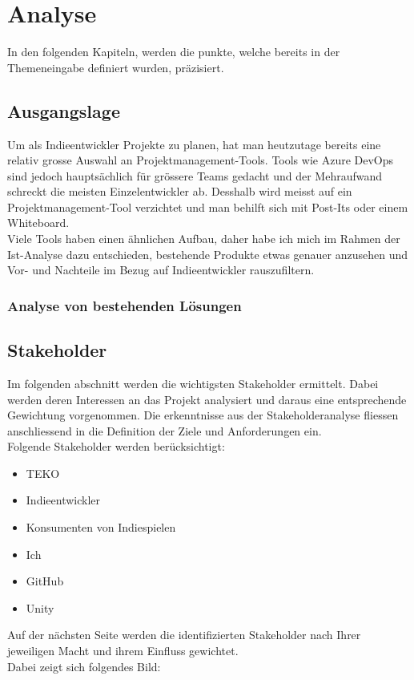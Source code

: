 \section{Analyse}
In den folgenden Kapiteln, werden die punkte, welche bereits in der Themeneingabe
definiert wurden, präzisiert.

\subsection{Ausgangslage}
Um als Indieentwickler Projekte zu planen, hat man heutzutage bereits eine relativ grosse Auswahl an
Projektmanagement-Tools.
Tools wie Azure DevOps sind jedoch hauptsächlich für grössere Teams gedacht und der Mehraufwand schreckt die meisten Einzelentwickler ab.
Desshalb wird meisst auf ein Projektmanagement-Tool verzichtet und man behilft sich mit Post-Its oder einem Whiteboard.\\
Viele Tools haben einen ähnlichen Aufbau, daher habe ich mich im Rahmen der Ist-Analyse dazu entschieden, bestehende Produkte etwas genauer anzusehen und Vor- und Nachteile 
im Bezug auf Indieentwickler rauszufiltern.

\subsubsection{Analyse von bestehenden Lösungen}


\newpage

\newpage

\subsection{Stakeholder}

Im folgenden abschnitt werden die wichtigsten Stakeholder ermittelt.
Dabei werden deren Interessen an das Projekt analysiert und daraus eine entsprechende Gewichtung vorgenommen.
Die erkenntnisse aus der Stakeholderanalyse fliessen anschliessend in die
Definition der Ziele und Anforderungen ein.\\
Folgende Stakeholder werden berücksichtigt:\\

\begin{itemize}
    \item TEKO
    \item Indieentwickler
    \item Konsumenten von Indiespielen
    \item Ich
    \item GitHub
    \item Unity
\end{itemize}
\vspace{1cm}
Auf der nächsten Seite werden die identifizierten Stakeholder nach Ihrer jeweiligen Macht und ihrem Einfluss gewichtet.\\
Dabei zeigt sich folgendes Bild:

